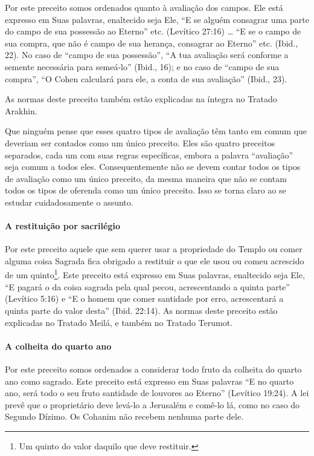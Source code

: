 Por este preceito somos ordenados quanto à avaliação dos campos. Ele
está expresso em Suas palavras, enaltecido seja Ele, ``E se alguém
consagrar uma parte do campo de sua possessão ao Eterno'' etc. (Levítico
27:16) \ldots{} ``E se o campo de sua compra, que não é campo de sua herança,
consagrar ao Eterno'' etc. (Ibid., 22). No caso de ``campo de sua
possessão'', ``A tua avaliação será conforme a semente necessária para
semeá-lo'' (Ibid., 16); e no caso de ``campo de sua compra'', ``O
Cohen calculará para ele, a conta de sua avaliação'' (Ibid., 23).

As normas deste preceito também estão explicadas na íntegra no Tratado Arakhin.

Que ninguém pense que esses quatro tipos de avaliação têm tanto em comum
que deveriam ser contados como um único preceito. Eles são quatro
preceitos separados, cada um com suas regras específicas, embora a
palavra ``avaliação'' seja comum a todos eles. Consequentemente não se
devem contar todos os tipos de avaliação como um único preceito, da
mesma maneira que não se contam todos os tipos de oferenda como um único
preceito. Isso se torna claro ao se estudar cuidadosamente o assunto.

\paragraph{A restituição por sacrilégio}

Por este preceito aquele que sem querer usar a propriedade do Templo ou
comer alguma coisa Sagrada fica obrigado a restituir o que ele usou ou
comeu acrescido de um quinto\footnote{Um quinto do valor daquilo que deve restituir.}. Este preceito está
expresso em Suas palavras, enaltecido seja Ele, ``E pagará o da coisa
sagrada pela qual pecou, acrescentando a quinta parte'' (Levítico 5:16)
e ``E o homem que comer santidade por erro, acrescentará a quinta parte
do valor desta'' (Ibid. 22:14). As normas deste preceito estão
explicadas no Tratado Meilá, e também no Tratado Terumot.

\paragraph{A colheita do quarto ano}

Por este preceito somos ordenados a considerar todo fruto da colheita
do quarto ano como sagrado. Este preceito está expresso em Suas
palavras ``E no quarto ano, será todo o seu fruto santidade de louvores
ao Eterno'' (Levítico 19:24). A lei prevê que o proprietário deve
levá-lo a Jerusalém e comê-lo lá, como no caso do Segundo Dízimo. Os
Cohanim não recebem nenhuma parte dele.

